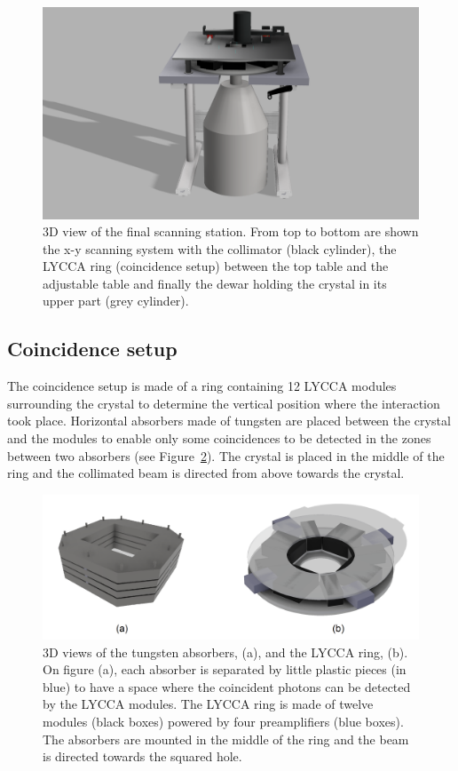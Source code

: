 \documentclass[11pt,a4paper]{article}
\begin{document}
\begin{figure}[!h]
\centering
\includegraphics[scale=0.2]{final_setup.png}
\caption{3D view of the final scanning station. From top to bottom are shown the x-y scanning system with the collimator (black cylinder), the LYCCA ring (coincidence setup) between the top table and the adjustable table and finally the dewar holding the crystal in its upper part (grey cylinder).}
\label{3D_total}
\end{figure}

\subsection{Coincidence setup} \label{coin_setup}

The coincidence setup is made of a ring containing 12 LYCCA modules surrounding the crystal to determine the vertical position where the interaction took place. Horizontal absorbers made of tungsten are placed between the crystal and the modules to enable only some coincidences to be detected in the zones between two absorbers (see Figure~\ref{coïncidence}). The crystal is placed in the middle of the ring and the collimated beam is directed from above towards the crystal.

\begin{figure}[!h]
\centering
\includegraphics[scale=0.3]{coincidence.png}
\caption{3D views of the tungsten absorbers, (a), and the LYCCA ring, (b). On figure (a), each absorber is separated by little plastic pieces (in blue) to have a space where the coincident photons can be detected by the LYCCA modules. The LYCCA ring is made of twelve modules (black boxes) powered by four preamplifiers (blue boxes). The absorbers are mounted in the middle of the ring and the beam is directed towards the squared hole.}
\label{coïncidence}
\end{figure}
\end{document}
